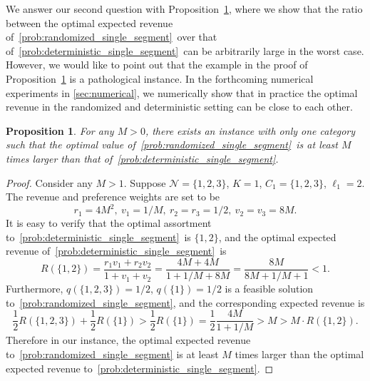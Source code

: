 \documentclass[msom,non-blindrev]{informs3} %
\newtheorem{proposition}[theorem]{Proposition}
\theoremstyle{definition}
\begin{document}
We answer our second question with Proposition~\ref{prop:integrality_gap}, where we show that the ratio between the optimal expected revenue of~\eqref{prob:randomized_single_segment}~over that of~\eqref{prob:deterministic_single_segment}~can be arbitrarily large in the worst case. However, we would like to point out that the example in the proof of Proposition~\ref{prop:integrality_gap} is  a pathological instance. In the forthcoming numerical experiments in \cref{sec:numerical}, we numerically show that in practice the optimal revenue in the randomized and deterministic setting can be close to each other.

\begin{proposition}\label{prop:integrality_gap}
For any $M>0$, there exists an instance with only one category such that the optimal value of~\eqref{prob:randomized_single_segment}~is at least $M$ times larger than that of~\eqref{prob:deterministic_single_segment}.
\end{proposition}

\begin{proof}
Consider any $M>1$. Suppose $\mathcal{N}=\{1,2,3\}$, $K=1$, $C_1=\{1,2,3\}$, $\ell_1=2$. The revenue and preference weights are set to be
\begin{equation*}
r_1=4M^2,\ v_1=1/M,\ r_2=r_3=1/2,\ v_2=v_3=8M.
\end{equation*}
It is easy to verify that the optimal assortment to~\eqref{prob:deterministic_single_segment}~is $\{1,2\}$, and the optimal expected revenue of~\eqref{prob:deterministic_single_segment}~is
\begin{equation*}
R(\{1,2\})=\dfrac{r_1v_1+r_2v_2}{1+v_1+v_2}=\dfrac{4M+4M}{1+1/M+8M}=\dfrac{8M}{8M+1/M+1}<1.
\end{equation*}
Furthermore, $q(\{1,2,3\})=1/2$, $q(\{1\})=1/2$ is a feasible solution to~\eqref{prob:randomized_single_segment}, and the corresponding expected revenue is
\begin{equation*}
\dfrac{1}{2}R(\{1,2,3\})+\dfrac{1}{2}R(\{1\})>\dfrac{1}{2}R(\{1\})=\dfrac{1}{2}\dfrac{4M}{1+1/M}>M>M\cdot R(\{1,2\}).
\end{equation*}
Therefore in our instance, the optimal expected revenue to~\eqref{prob:randomized_single_segment} is at least $M$ times larger than the optimal expected revenue to~\eqref{prob:deterministic_single_segment}.
\end{proof}
\end{document}
